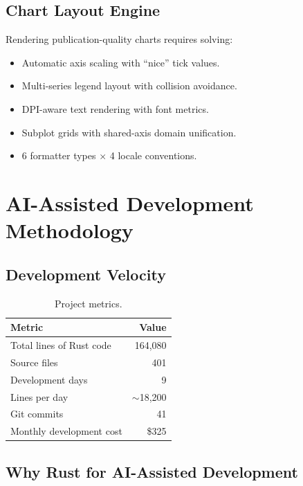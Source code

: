 \documentclass[11pt,a4paper]{article}
\begin{document}
\subsection{Chart Layout Engine}

Rendering publication-quality charts requires solving:

\begin{itemize}[nosep]
    \item Automatic axis scaling with ``nice'' tick values.
    \item Multi-series legend layout with collision avoidance.
    \item DPI-aware text rendering with font metrics.
    \item Subplot grids with shared-axis domain unification.
    \item 6 formatter types $\times$ 4 locale conventions.
\end{itemize}

\section{AI-Assisted Development Methodology}

\subsection{Development Velocity}

\begin{table}[H]
\centering
\caption{Project metrics.}
\begin{tabular}{lr}
\toprule
\textbf{Metric} & \textbf{Value} \\
\midrule
Total lines of Rust code & 164,080 \\
Source files & 401 \\
Development days & 9 \\
Lines per day & $\sim$18,200 \\
Git commits & 41 \\
Monthly development cost & \$325 \\
\bottomrule
\end{tabular}
\end{table}

\subsection{Why Rust for AI-Assisted Development}
\end{document}
